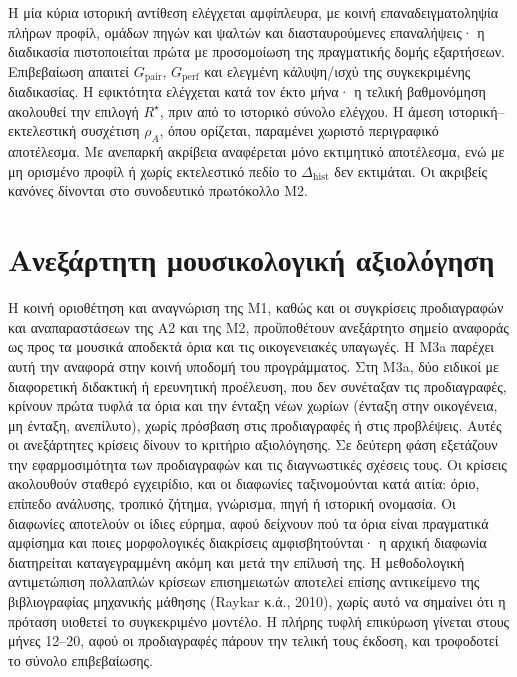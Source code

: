 \documentclass[a4paper]{article}
\newcommand{\dhist}{\ensuremath{\Delta_{\mathrm{hist}}}}
\newcommand{\Rs}{\ensuremath{R^{\star}}}
\begin{document}
Η μία κύρια ιστορική αντίθεση ελέγχεται αμφίπλευρα, με κοινή επαναδειγματοληψία πλήρων προφίλ, ομάδων πηγών και ψαλτών και διασταυρούμενες επαναλήψεις· η διαδικασία πιστοποιείται πρώτα με προσομοίωση της πραγματικής δομής εξαρτήσεων. Επιβεβαίωση απαιτεί $G_{\mathrm{pair}}$, $G_{\mathrm{perf}}$ και ελεγμένη κάλυψη/ισχύ της συγκεκριμένης διαδικασίας. Η εφικτότητα ελέγχεται κατά τον έκτο μήνα· η τελική βαθμονόμηση ακολουθεί την επιλογή $\Rs$, πριν από το ιστορικό σύνολο ελέγχου. Η άμεση ιστορική--εκτελεστική συσχέτιση $\rho_A$, όπου ορίζεται, παραμένει χωριστό περιγραφικό αποτέλεσμα. Με ανεπαρκή ακρίβεια αναφέρεται μόνο εκτιμητικό αποτέλεσμα, ενώ με μη ορισμένο προφίλ ή χωρίς εκτελεστικό πεδίο το $\dhist$ δεν εκτιμάται. Οι ακριβείς κανόνες δίνονται στο συνοδευτικό πρωτόκολλο Μ2.

\section{Ανεξάρτητη μουσικολογική αξιολόγηση}\label{sec:validation}
Η κοινή οριοθέτηση και αναγνώριση της Μ1, καθώς και οι συγκρίσεις προδιαγραφών και αναπαραστάσεων της Α2 και της Μ2, προϋποθέτουν ανεξάρτητο σημείο αναφοράς ως προς τα μουσικά αποδεκτά όρια και τις οικογενειακές υπαγωγές. Η Μ3a παρέχει αυτή την αναφορά στην κοινή υποδομή του προγράμματος. Στη Μ3a, δύο ειδικοί με διαφορετική διδακτική ή ερευνητική προέλευση, που δεν συνέταξαν τις προδιαγραφές, κρίνουν πρώτα τυφλά τα όρια και την ένταξη νέων χωρίων (ένταξη στην οικογένεια, μη ένταξη, ανεπίλυτο), χωρίς πρόσβαση στις προδιαγραφές ή στις προβλέψεις. Αυτές οι ανεξάρτητες κρίσεις δίνουν το κριτήριο αξιολόγησης. Σε δεύτερη φάση εξετάζουν την εφαρμοσιμότητα των προδιαγραφών και τις διαγνωστικές σχέσεις τους. Οι κρίσεις ακολουθούν σταθερό εγχειρίδιο, και οι διαφωνίες ταξινομούνται κατά αιτία: όριο, επίπεδο ανάλυσης, τροπικό ζήτημα, γνώρισμα, πηγή ή ιστορική ονομασία. Οι διαφωνίες αποτελούν οι ίδιες εύρημα, αφού δείχνουν πού τα όρια είναι πραγματικά αμφίσημα και ποιες μορφολογικές διακρίσεις αμφισβητούνται· η αρχική διαφωνία διατηρείται καταγεγραμμένη ακόμη και μετά την επίλυσή της. Η μεθοδολογική αντιμετώπιση πολλαπλών κρίσεων επισημειωτών αποτελεί επίσης αντικείμενο της βιβλιογραφίας μηχανικής μάθησης (Raykar κ.ά., 2010), χωρίς αυτό να σημαίνει ότι η πρόταση υιοθετεί το συγκεκριμένο μοντέλο. Η πλήρης τυφλή επικύρωση γίνεται στους μήνες 12--20, αφού οι προδιαγραφές πάρουν την τελική τους έκδοση, και τροφοδοτεί το σύνολο επιβεβαίωσης.
\end{document}
